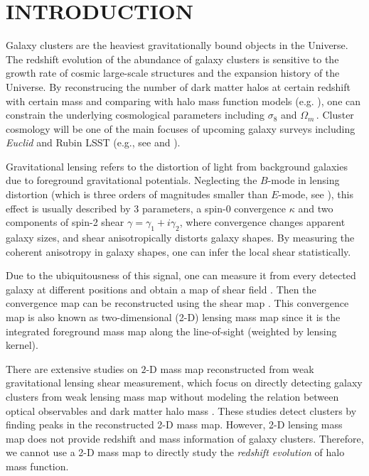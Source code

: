 \documentclass[twocolumn, usenames, dvipsnames]{aastex63}
\begin{document}
\section{INTRODUCTION}
Galaxy clusters
are the
heaviest gravitationally bound objects in the Universe. The redshift evolution of the
abundance of galaxy clusters is sensitive to the growth rate of cosmic large-scale
structures and the expansion history of the Universe. By reconstrucing the number
of dark matter halos at certain redshift with certain mass and comparing with
halo mass function models (e.g. \citealt{Tinker2010, haloMassFunc_Despli2016}),
one can constrain the underlying cosmological parameters including $\sigma_8$
and $\Omega_m$\,. Cluster cosmology will be one of the main focuses of
upcoming galaxy surveys including \emph{Euclid} and Rubin LSST (e.g., see
\citealt{EuclidLaureijs} and \citealt{LSSTOverviwe2019}).

Gravitational lensing refers to the distortion of light from background
galaxies due to foreground gravitational potentials. Neglecting the $B$-mode in
lensing distortion (which is three orders of magnitudes smaller than $E$-mode,
see \citealt{BmodeLensing_Krause2010}), this effect is usually described by 3
parameters, a spin-0 convergence $\kappa$ and two components of spin-2 shear
$\gamma = \gamma_1 + i\gamma_2$, where convergence changes apparent galaxy
sizes, and shear anisotropically distorts galaxy shapes. By measuring the
coherent anisotropy in galaxy shapes, one can infer the local shear statistically.

Due to the ubiquitousness of this signal, one can measure it from every
detected galaxy at different positions and obtain a map of
shear field \citep{FPFS2022b}. Then the convergence map can be reconstructed using the shear map
\citep{massMap_KS1993}. This convergence map is also known as two-dimensional
(2-D) lensing mass map since it is the integrated foreground mass map along the
line-of-sight (weighted by lensing kernel).

There are extensive studies on $2$-D mass map reconstructed from weak
gravitational lensing shear measurement, which focus on directly detecting
galaxy clusters from weak lensing mass map without modeling the relation
between optical observables and dark matter halo mass
\citep{massMap_HSC1_cluster, massMap_HSC1_cluster2, massMap_HSC3_cluster}.
These studies detect clusters by finding peaks in the reconstructed 2-D mass
map. However, 2-D lensing mass map does not provide redshift and mass
information of galaxy clusters. Therefore, we cannot use a 2-D mass map to
directly study the {\it redshift evolution} of halo mass function.
\end{document}
